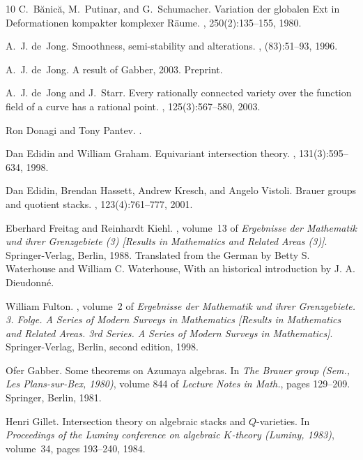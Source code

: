 \documentclass[11pt]{amsart}
\renewcommand{\[}{[\!\hspace{0.03em}[}
\renewcommand{\]}{]\!\hspace{0.03em}]}
\renewcommand{\(}{(\!\hspace{0.03em}(}
\renewcommand{\)}{)\!\hspace{0.03em})}
\theoremstyle{definition}
\theoremstyle{remark}
\begin{document}
\begin{thebibliography}{10}
C.~B{\u{a}}nic{\u{a}}, M.~Putinar, and G.~Schumacher.
\newblock Variation der globalen {E}xt in {D}eformationen kompakter komplexer
  {R}\"aume.
, 250(2):135--155, 1980.

A.~J. de~Jong.
\newblock Smoothness, semi-stability and alterations.
, (83):51--93, 1996.

A.~J. de~Jong.
\newblock A result of {G}abber, 2003.
\newblock Preprint.

A.~J. de~Jong and J.~Starr.
\newblock Every rationally connected variety over the function field of a curve
  has a rational point.
, 125(3):567--580, 2003.

Ron Donagi and Tony Pantev.
.

Dan Edidin and William Graham.
\newblock Equivariant intersection theory.
, 131(3):595--634, 1998.

Dan Edidin, Brendan Hassett, Andrew Kresch, and Angelo Vistoli.
\newblock Brauer groups and quotient stacks.
, 123(4):761--777, 2001.

Eberhard Freitag and Reinhardt Kiehl.
, volume~13 of
  {\em Ergebnisse der Mathematik und ihrer Grenzgebiete (3) [Results in
  Mathematics and Related Areas (3)]}.
\newblock Springer-Verlag, Berlin, 1988.
\newblock Translated from the German by Betty S. Waterhouse and William C.
  Waterhouse, With an historical introduction by J. A. Dieudonn\'e.

William Fulton.
, volume~2 of {\em Ergebnisse der Mathematik
  und ihrer Grenzgebiete. 3. Folge. A Series of Modern Surveys in Mathematics
  [Results in Mathematics and Related Areas. 3rd Series. A Series of Modern
  Surveys in Mathematics]}.
\newblock Springer-Verlag, Berlin, second edition, 1998.

Ofer Gabber.
\newblock Some theorems on {A}zumaya algebras.
\newblock In {\em The Brauer group (Sem., Les Plans-sur-Bex, 1980)}, volume 844
  of {\em Lecture Notes in Math.}, pages 129--209. Springer, Berlin, 1981.

Henri Gillet.
\newblock Intersection theory on algebraic stacks and {$Q$}-varieties.
\newblock In {\em Proceedings of the Luminy conference on algebraic $K$-theory
  (Luminy, 1983)}, volume~34, pages 193--240, 1984.


\end{thebibliography}
\end{document}
